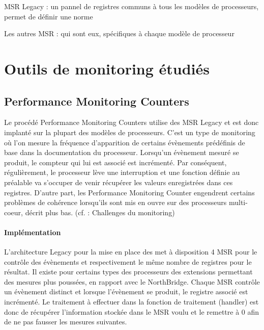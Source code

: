 		\benum
			\item{MSR Legacy : un pannel de registres communs à tous les modèles de processeurs, permet de définir une norme}
			\item{Les autres MSR : qui sont eux, spécifiques à chaque modèle de processeur}
		\eenum
	\section{Outils de monitoring étudiés}
	\subsection{Performance Monitoring Counters}
		Le procédé Performance Monitoring Counters utilise des MSR Legacy et est donc implanté sur la plupart des modèles de processeurs. C'est un type de monitoring où l'on mesure la fréquence d'apparition de certains évènements prédéfinis de base dans la documentation du processeur. Lorsqu'un évènement mesuré se produit, le compteur qui lui est associé est incrémenté. Par conséquent, régulièrement, le processeur lève une interruption et une fonction définie au préalable va s'occuper de venir récupérer les valeurs enregistrées dans ces registres. D'autre part, les Performance Monitoring Counter engendrent certains problèmes de cohérence lorsqu'ils sont mis en ouvre sur des processeurs multi-coeur, décrit plus bas. (cf. : Challenges du monitoring)
		\paragraph{Implémentation}
			L'architecture Legacy pour la mise en place des \PMC met à disposition 4 MSR pour le contrôle des évènements et respectivement le même nombre de registres pour le résultat. Il existe pour certains types des processeurs des extensions permettant des mesures plus poussées, en rapport avec le NorthBridge. Chaque MSR contrôle un évènement distinct et lorsque l'évènement se produit, le registre associé est incrémenté. Le traitement à effectuer dans la fonction de traitement (handler) est donc de récupérer l'information stockée dans le MSR voulu et le remettre à 0 afin de ne pas fausser les mesures suivantes.
